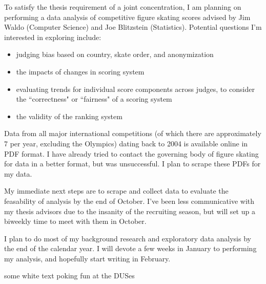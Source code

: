 \documentclass[12pt]{article}
\begin{document}
	\maketitle
	
	To satisfy the thesis requirement of a joint concentration, I am planning on performing a data analysis of competitive figure skating scores advised by Jim Waldo (Computer Science) and Joe Blitzstein (Statistics). Potential questions I'm interested in exploring include:
	\begin{itemize}
		\item judging bias based on country, skate order, and anonymization
		\item the impacts of changes in scoring system
		\item evaluating trends for individual score components across judges, to consider the ``correctness" or ``fairness" of a scoring system
		\item the validity of the ranking system
	\end{itemize}
	Data from all major international competitions (of which there are approximately 7 per year, excluding the Olympics) dating back to 2004 is available online in PDF format. I have already tried to contact the governing body of figure skating for data in a better format, but was unsuccessful. I plan to scrape these PDFs for my data.
	
	My immediate next steps are to scrape and collect data to evaluate the feasability of analysis by the end of October. I've been less communicative with my thesis advisors due to the insanity of the recruiting season, but will set up a biweekly time to meet with them in October.
	
	I plan to do most of my background research and exploratory data analysis by the end of the calendar year. I will devote a few weeks in January to performing my analysis, and hopefully start writing in February.
	
	{\color{white} some white text poking fun at the DUSes }
\end{document}
